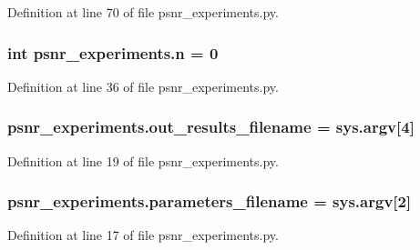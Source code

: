 Definition at line 70 of file psnr\+\_\+experiments.\+py.

\subsubsection[{\texorpdfstring{n}{n}}]{\setlength{\rightskip}{0pt plus 5cm}int psnr\+\_\+experiments.\+n = 0}\hypertarget{namespacepsnr__experiments_a95bd6fade9f6e50f91daf28b20ab6d33}{}\label{namespacepsnr__experiments_a95bd6fade9f6e50f91daf28b20ab6d33}


Definition at line 36 of file psnr\+\_\+experiments.\+py.

\subsubsection[{\texorpdfstring{out\+\_\+results\+\_\+filename}{out_results_filename}}]{\setlength{\rightskip}{0pt plus 5cm}psnr\+\_\+experiments.\+out\+\_\+results\+\_\+filename = sys.\+argv\mbox{[}4\mbox{]}}\hypertarget{namespacepsnr__experiments_a2b33b493337c179f491d18d3a4febdbf}{}\label{namespacepsnr__experiments_a2b33b493337c179f491d18d3a4febdbf}


Definition at line 19 of file psnr\+\_\+experiments.\+py.

\subsubsection[{\texorpdfstring{parameters\+\_\+filename}{parameters_filename}}]{\setlength{\rightskip}{0pt plus 5cm}psnr\+\_\+experiments.\+parameters\+\_\+filename = sys.\+argv\mbox{[}2\mbox{]}}\hypertarget{namespacepsnr__experiments_a0232c22d1dfe44a97729ae546b058128}{}\label{namespacepsnr__experiments_a0232c22d1dfe44a97729ae546b058128}


Definition at line 17 of file psnr\+\_\+experiments.\+py.

